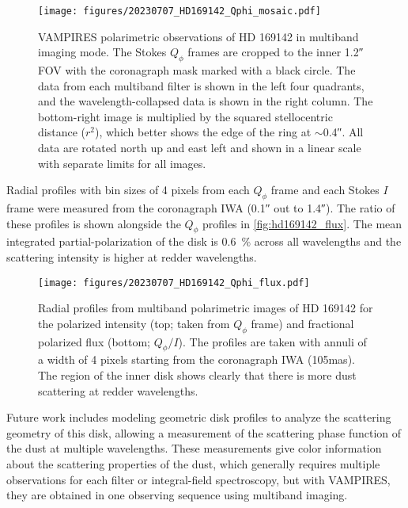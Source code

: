 \begin{figure*}[t]
    \centering
    \texttt{[image: figures/20230707\_HD169142\_Qphi\_mosaic.pdf]}
    \caption{VAMPIRES polarimetric observations of HD 169142 in multiband imaging mode. The Stokes $Q_\phi$ frames are cropped to the inner \ang{;;1.2} FOV with the coronagraph mask marked with a black circle. The data from each multiband filter is shown in the left four quadrants, and the wavelength-collapsed data is shown in the right column. The bottom-right image is multiplied by the squared stellocentric distance ($r^2$), which better shows the edge of the ring at $\sim$\ang{;;0.4}. All data are rotated north up and east left and shown in a linear scale with separate limits for all images.\label{fig:hd169142_mosaic}}
\end{figure*}

Radial profiles with bin sizes of 4 pixels from each $Q_\phi$ frame and each Stokes $I$ frame were measured from the coronagraph IWA (\ang{;;0.1} out to \ang{;;1.4}). The ratio of these profiles is shown alongside the $Q_\phi$ profiles in \autoref{fig:hd169142_flux}. The mean integrated partial-polarization of the disk is \SI{0.6}{\%} across all wavelengths and the scattering intensity is higher at redder wavelengths. 

\begin{figure}[h]
    \centering
    \texttt{[image: figures/20230707\_HD169142\_Qphi\_flux.pdf]}
    \caption{Radial profiles from multiband polarimetric images of HD 169142 for the polarized intensity (top; taken from $Q_\phi$ frame) and fractional polarized flux (bottom; $Q_\phi/I$). The profiles are taken with annuli of a width of 4 pixels starting from the coronagraph IWA (\si{105}{mas}). The region of the inner disk shows clearly that there is more dust scattering at redder wavelengths.\label{fig:hd169142_flux}}
\end{figure}

Future work includes modeling geometric disk profiles to analyze the scattering geometry of this disk, allowing a measurement of the scattering phase function of the dust at multiple wavelengths. These measurements give color information about the scattering properties of the dust, which generally requires multiple observations for each filter or integral-field spectroscopy, but with VAMPIRES, they are obtained in one observing sequence using multiband imaging.

